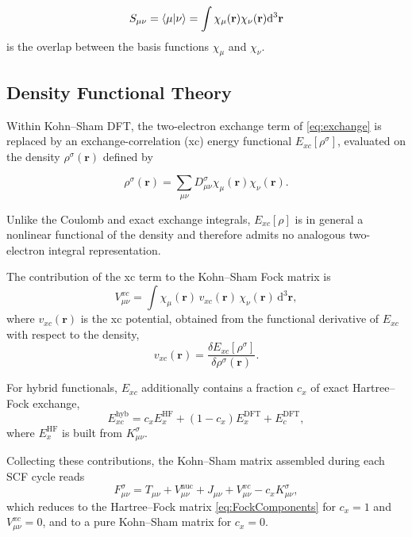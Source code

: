 \documentclass{article}
\begin{document}
\begin{equation}
  S_{\mu\nu} =  \braket{\mu | \nu} = \int \chi_\mu(\mathbf r)
  \chi_\nu (\mathbf r) \mathrm d ^3 \mathbf r
  \label{eq:overlap}
\end{equation}
is the overlap between the basis functions $\chi_\mu$ and $\chi_\nu$.

\subsection{Density Functional Theory}\label{subsec:DFT}

Within Kohn--Sham DFT, the two-electron exchange term of
\eqref{eq:exchange} is replaced by an exchange-correlation (xc)
energy functional $E_{xc}[\rho^\sigma]$, evaluated on the density
$\rho^\sigma(\mathbf r)$ defined by

\begin{equation}
  \rho^\sigma(\mathbf r) =
  \sum_{\mu\nu}D^\sigma_{\mu\nu}\chi_\mu(\mathbf r) \chi_\nu(\mathbf r).
  \label{eq:density}
\end{equation}

Unlike the Coulomb and exact exchange integrals, $E_{xc}[\rho]$ is in
general a nonlinear functional of the density and therefore admits no
analogous two-electron integral representation.

The contribution of the xc term to the Kohn--Sham Fock matrix is
\begin{equation}
  V^{xc}_{\mu\nu} = \int \chi_\mu(\mathbf r)\, v_{xc}(\mathbf
  r)\, \chi_\nu(\mathbf r)\, \mathrm d^3 \mathbf r,
  \label{eq:xc-matrix}
\end{equation}
where $v_{xc}(\mathbf r)$ is the xc potential, obtained from the
functional derivative of $E_{xc}$ with respect to the density,
\begin{equation}
  v_{xc}(\mathbf r) = \frac{\delta E_{xc}[\rho^\sigma]}{\delta
  \rho^\sigma(\mathbf r)}.
  \label{eq:xc-potential}
\end{equation}

For hybrid functionals, $E_{xc}$ additionally contains a fraction
$c_x$ of exact Hartree--Fock exchange,
\begin{equation}
  E_{xc}^{\text{hyb}} = c_x E_x^{\text{HF}} + (1-c_x) E_x^{\text{DFT}}
  + E_c^{\text{DFT}},
  \label{eq:hybrid-xc}
\end{equation}
where $E_x^{\text{HF}}$ is built from $K^\sigma_{\mu\nu}$.

Collecting these contributions, the Kohn--Sham matrix assembled during
each SCF cycle reads
\begin{equation}
  F^\sigma_{\mu\nu} = T_{\mu\nu} + V^{\text{nuc}}_{\mu\nu} + J_{\mu\nu}
  + V^{xc}_{\mu\nu} - c_x K^\sigma_{\mu\nu},
  \label{eq:ks-matrix}
\end{equation}
which reduces to the Hartree--Fock matrix \eqref{eq:FockComponents} for
$c_x = 1$ and $V^{xc}_{\mu\nu} = 0$, and to a pure Kohn--Sham matrix for
$c_x = 0$.
\end{document}

